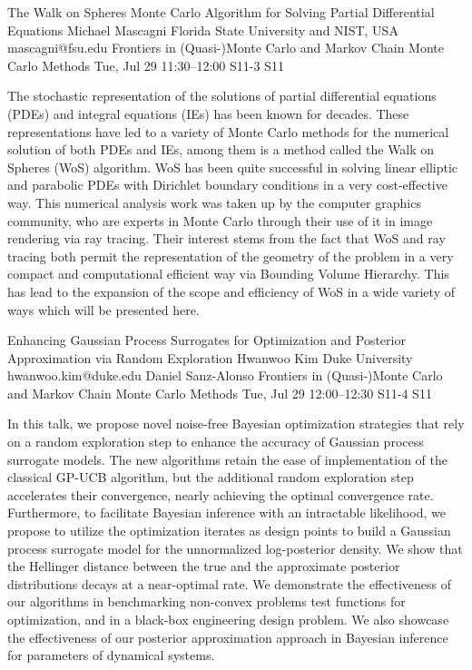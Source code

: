 \documentclass[12pt,lettersize,oneside]{book} %
\begin{document}
\begin{talk}
  {The Walk on Spheres Monte Carlo Algorithm for Solving Partial Differential Equations}%
  {Michael Mascagni}%
  {Florida State University and NIST, USA}%
  {mascagni@fsu.edu}%
  {Frontiers in (Quasi-)Monte Carlo and Markov Chain Monte Carlo Methods}%
  {}%
  {Tue, Jul 29 11:30--12:00}%
  {S11-3}%
  {S11}%
    
   
The stochastic representation of the solutions of partial differential equations (PDEs) and integral equations (IEs) has been known for decades.  These representations have led to a variety of Monte Carlo methods for the numerical solution of both PDEs and IEs, among them is a method called the Walk on Spheres (WoS) algorithm.  WoS has been quite successful in solving linear elliptic and parabolic PDEs with Dirichlet boundary conditions in a very cost-effective way.  This numerical analysis work was taken up by the computer graphics community, who are experts in Monte Carlo through their use of it in image rendering via ray tracing.  Their interest stems from the fact that WoS and ray tracing both permit the representation of the geometry of the problem in a very compact and computational efficient way via Bounding Volume Hierarchy.  This has lead to the expansion of the scope and efficiency of WoS in a wide variety of ways which will be presented here.
\end{talk}

\begin{talk}
  {Enhancing Gaussian Process Surrogates for Optimization and Posterior Approximation via Random Exploration}%
  {Hwanwoo Kim}%
  {Duke University}%
  {hwanwoo.kim@duke.edu}%
  {Daniel Sanz-Alonso}%
  {Frontiers in (Quasi-)Monte Carlo and Markov Chain Monte Carlo Methods}%
  {Tue, Jul 29 12:00--12:30}%
  {S11-4}%
  {S11}%
    
   
In this talk, we propose novel noise-free Bayesian optimization strategies that rely on a random exploration step to enhance the accuracy of Gaussian process surrogate models. The new algorithms retain the ease of implementation of the classical GP-UCB algorithm, but the additional random exploration step accelerates their convergence, nearly achieving the optimal convergence rate. Furthermore, to facilitate Bayesian inference with an intractable likelihood, we propose to utilize the optimization iterates as design points to build a Gaussian process surrogate model for the unnormalized log-posterior density. We show that the Hellinger distance between the true and the approximate posterior distributions decays at a near-optimal rate. We demonstrate the effectiveness of our algorithms in benchmarking non-convex problems test functions for optimization, and in a black-box engineering design problem. We also showcase the effectiveness of our posterior approximation approach in Bayesian inference for parameters of dynamical systems.


\end{talk}
\end{document}
